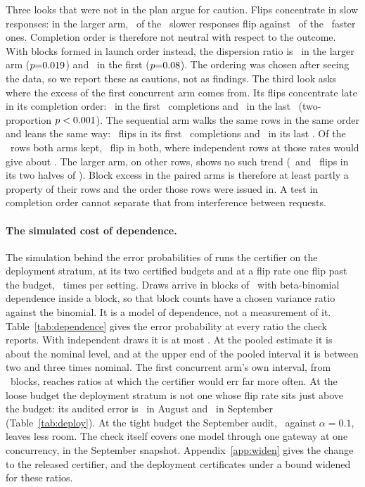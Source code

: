 Three looks that were not in the plan argue for caution. Flips
concentrate in slow responses: in the larger arm, \indepExtSlowFlips\
of the \indepExtHalfRows\ slower responses flip against
\indepExtFastFlips\ of the \indepExtHalfRows\ faster ones. Completion
order is therefore not neutral with respect to the outcome. With blocks
formed in launch order instead, the dispersion ratio is
\indepExtLaunchDispersion\ in the larger arm ($p{=}0.019$)
and \indepLaunchDispersion\ in the first ($p{=}0.08$). The
ordering was chosen after seeing the data, so we report these as
cautions, not as findings. The third look asks where the excess of the
first concurrent arm comes from. Its flips concentrate late in its
completion order: \indepConcFirstHalfFlips\ in the first
\indepConcHalfN\ completions and \indepConcSecondHalfFlips\ in the last
\indepConcHalfN\ (two-proportion $p<0.001$). The sequential
arm walks the same rows in the same order and leans the same way:
\indepSeqFirstHalfFlips\ flips in its first \indepSeqFirstHalfN\
completions and \indepSeqSecondHalfFlips\ in its last
\indepSeqSecondHalfN. Of the \indepBothRows\ rows both arms kept,
\indepBothFlipRows\ flip in both, where independent rows at those rates
would give about \indepBothFlipExpected. The larger arm, on other rows,
shows no such trend (\indepExtFirstHalfFlips\ and
\indepExtSecondHalfFlips\ flips in its two halves of \indepExtHalfN).
Block excess in the paired arms is therefore at least partly a property
of their rows and the order those rows were issued in. A test in
completion order cannot separate that from interference between
requests.

\keeprunin
\paragraph{The simulated cost of dependence.} The simulation behind
the error probabilities of  runs the certifier
on the deployment stratum, at its two certified budgets and at a flip
rate one flip past the budget, \overdispTrials\ times per setting. Draws
arrive in blocks of \indepBlockSize\ with beta-binomial dependence
inside a block, so that block counts have a chosen variance ratio
against the binomial. It is a model of dependence, not a measurement of
it. Table~\ref{tab:dependence} gives the error probability at every
ratio the check reports. With independent draws it is at most
\overdispIndep. At the pooled estimate it is about the nominal level,
and at the upper end of the pooled interval it is between two and three
times nominal. The first concurrent arm's own interval, from
\indepBlocks\ blocks, reaches ratios at which the certifier would err
far more often. At the
loose budget the deployment stratum is not one whose flip rate sits just
above the budget: its audited error is \deployRealized\ in August and
\sepRealizedLoose\ in September (Table~\ref{tab:deploy}). At the tight
budget the September audit, \sepRealizedTight\ against $\alpha{=}0.1$,
leaves less room. The check itself covers one model through one gateway
at one concurrency, in the September snapshot. Appendix~\ref{app:widen}
gives the change to the released certifier, and the deployment
certificates under a bound widened for these ratios.



